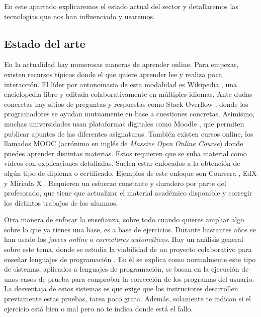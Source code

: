 
En este apartado explicaremos el estado actual del sector y detallaremos las tecnologías que nos han influenciado y usaremos.

\subsection{Estado del arte\label{subsec:introduction}}

En la actualidad hay numerosas maneras de aprender online. Para empezar, existen recursos típicos donde el que quiere aprender lee y realiza poca interacción. El líder por antonomasia de esta modalidad es Wikipedia \cite{wiki}, una enciclopedia libre y editada colaborativamente en múltiples idiomas. Ante dudas concretas hay sitios de preguntas y respuestas como Stack Overflow \cite{stack}, donde los programadores se ayudan mutuamente en base a cuestiones concretas. Asimismo, muchas universidades usan plataformas digitales como Moodle \cite{moodle}, que permiten publicar apuntes de las diferentes asignaturas. También existen cursos online, los llamados MOOC (acrónimo en inglés de \emph{Massive Open Online Course}) donde puedes aprender distintas materias. Estos requieren  que se suba material como vídeos con explicaciones detalladas. Suelen estar enfocados a la obtención de algún tipo de diploma o certificado. Ejemplos de este enfoque son Coursera \cite{coursera}, EdX \cite{edX} y Miriada X \cite{miriadaX}. Requieren un esfuerzo constante y duradero por parte del profesorado, que tiene que actualizar el material académico disponible y corregir los distintos trabajos de los alumnos. 
\vspace{1em}

Otra manera de enfocar la enseñanza, sobre todo cuando quieres ampliar algo sobre lo que ya tienes una base, es a base de ejercicios. Durante bastantes años se han usado los \emph{jueces online} o \emph{correctores automáticos}. Hay un análisis general sobre este tema, donde se estudia la viabilidad de un proyecto colaborativo para enseñar lenguajes de programación \cite{pimcdDuoCode14}. En él se explica como normalmente este tipo de sistemas, aplicados a lenguajes de programación, se basan en la ejecución de unos casos de prueba para comprobar la corrección de los programas del usuario. La desventaja de estos sistemas es que exige que los instructores desarrollen previamente estas pruebas, tarea poco grata. Además, solamente te indican si el ejercicio está bien o mal pero no te indica donde está el fallo.
\vspace{1em}

